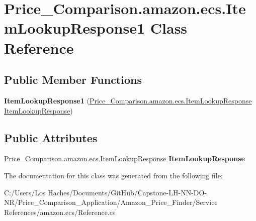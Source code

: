 \hypertarget{class_price___comparison_1_1amazon_1_1ecs_1_1_item_lookup_response1}{\section{Price\-\_\-\-Comparison.\-amazon.\-ecs.\-Item\-Lookup\-Response1 Class Reference}
\label{class_price___comparison_1_1amazon_1_1ecs_1_1_item_lookup_response1}
}
\subsection*{Public Member Functions}
\begin{DoxyCompactItemize}
\item 
\hypertarget{class_price___comparison_1_1amazon_1_1ecs_1_1_item_lookup_response1_aa700fab68f8d0370be5fbc48f0e66a51}{{\bfseries Item\-Lookup\-Response1} (\hyperlink{class_price___comparison_1_1amazon_1_1ecs_1_1_item_lookup_response}{Price\-\_\-\-Comparison.\-amazon.\-ecs.\-Item\-Lookup\-Response} \hyperlink{class_price___comparison_1_1amazon_1_1ecs_1_1_item_lookup_response}{Item\-Lookup\-Response})}\label{class_price___comparison_1_1amazon_1_1ecs_1_1_item_lookup_response1_aa700fab68f8d0370be5fbc48f0e66a51}

\end{DoxyCompactItemize}
\subsection*{Public Attributes}
\begin{DoxyCompactItemize}
\item 
\hypertarget{class_price___comparison_1_1amazon_1_1ecs_1_1_item_lookup_response1_a38681ab9b02cda058c398c9ad0fb5aeb}{\hyperlink{class_price___comparison_1_1amazon_1_1ecs_1_1_item_lookup_response}{Price\-\_\-\-Comparison.\-amazon.\-ecs.\-Item\-Lookup\-Response} {\bfseries Item\-Lookup\-Response}}\label{class_price___comparison_1_1amazon_1_1ecs_1_1_item_lookup_response1_a38681ab9b02cda058c398c9ad0fb5aeb}

\end{DoxyCompactItemize}


The documentation for this class was generated from the following file\-:\begin{DoxyCompactItemize}
\item 
C\-:/\-Users/\-Los Haches/\-Documents/\-Git\-Hub/\-Capstone-\/\-L\-H-\/\-N\-N-\/\-D\-O-\/\-N\-R/\-Price\-\_\-\-Comparison\-\_\-\-Application/\-Amazon\-\_\-\-Price\-\_\-\-Finder/\-Service References/amazon.\-ecs/Reference.\-cs\end{DoxyCompactItemize}
